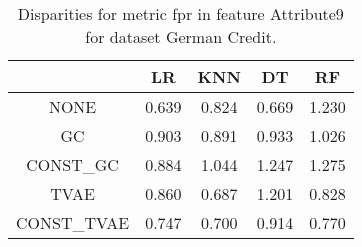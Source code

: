 \begin{table}
\caption{Disparities for metric fpr in feature Attribute9 for dataset German Credit.}
\label{tab:disp-GERMAN CREDIT-Attribute9-fpr}
\begin{tabular}{ccccc}
\toprule
 & LR & KNN & DT & RF \\
\midrule
NONE & 0.639 & 0.824 & 0.669 & 1.230 \\
GC & 0.903 & 0.891 & 0.933 & 1.026 \\
CONST\_GC & 0.884 & 1.044 & 1.247 & 1.275 \\
TVAE & 0.860 & 0.687 & 1.201 & 0.828 \\
CONST\_TVAE & 0.747 & 0.700 & 0.914 & 0.770 \\
\bottomrule
\end{tabular}
\end{table}

